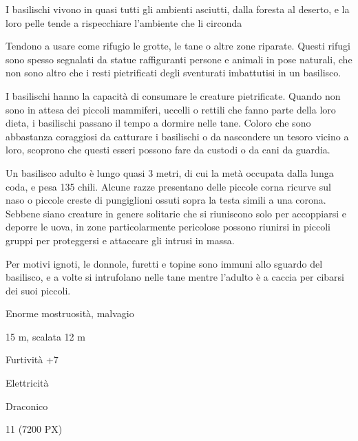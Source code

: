 \begin{multicols}{2}
{I basilischi vivono in quasi tutti gli ambienti asciutti, dalla foresta al deserto, e la loro pelle tende a rispecchiare l'ambiente che li circonda

Tendono a usare come rifugio le grotte, le tane o altre zone riparate. Questi rifugi sono spesso segnalati da statue raffiguranti persone e animali in pose naturali, che non sono altro che i resti pietrificati degli sventurati imbattutisi in un basilisco.

I basilischi hanno la capacità di consumare le creature pietrificate. Quando non sono in attesa dei piccoli mammiferi, uccelli o rettili che fanno parte della loro dieta, i basilischi passano il tempo a dormire nelle tane. Coloro che sono abbastanza coraggiosi da catturare i basilischi o da nascondere un tesoro vicino a loro, scoprono che questi esseri possono fare da custodi o da cani da guardia.

Un basilisco adulto è lungo quasi 3 metri, di cui la metà occupata dalla lunga coda, e pesa 135 chili. Alcune razze presentano delle piccole corna ricurve sul naso o piccole creste di pungiglioni ossuti sopra la testa simili a una corona. Sebbene siano creature in genere solitarie che si riuniscono solo per accoppiarsi e deporre le uova, in zone particolarmente pericolose possono riunirsi in piccoli gruppi per proteggersi e attaccare gli intrusi in massa.

Per motivi ignoti, le donnole, furetti e topine sono immuni allo sguardo del basilisco, e a volte si intrufolano nelle tane mentre l'adulto è a caccia per cibarsi dei suoi piccoli.


\begin{description}[noitemsep, topsep=0pt, parsep=0pt, partopsep=0pt, itemsep=1pt, leftmargin=2.35cm,  labelwidth=2.2cm, itemindent=0cm, listparindent=0pt] %
\setlength{\baselineskip}{10pt}
\item[\textbf{Taglia/Tipo}] Enorme mostruosità, malvagio
\item[\textbf{Caratt.}] 
\item[\textbf{Punti Ferita}] 
\item[\textbf{Movimento}] 15 m, scalata 12 m
\item[\textbf{Tiri Salvez.}] 
\item[\textbf{Comp.}] Furtività +7
\item[\textbf{Imm. Danni}] Elettricità
\item[\textbf{Sensi}] 
\item[\textbf{Linguaggi}] Draconico
\item[\textbf{Sfida}] 11 (7200 PX)
\end{description}
\smallskip

}
\end{multicols}
